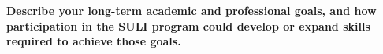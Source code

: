 \documentclass{article}
\begin{document}
\noindent\textbf{Describe your long-term academic and professional goals, and how participation in the SULI program could develop or expand skills required to achieve those goals.}
\\\\
\end{document}

